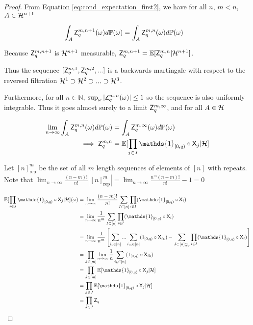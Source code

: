 \begin{proof}
From Equation \ref{eq:cond_expectation_first2}, we have for all $n$, $m<n$, $A\in \mathcal{H}^{n+1}$

\begin{align}
    \int_{A} \mathsf{Z}_q^{m,n+1} (\omega) d\mathbb{P}(\omega) &= \int_{A} \mathsf{Z}_q^{m,n} (\omega) d\mathbb{P}(\omega)
\end{align}

Because $\mathsf{Z}_q^{m,n+1}$ is $\mathcal{H}^{n+1}$ measurable, $\mathsf{Z}_q^{m,n+1} = \mathbb{E}[\mathsf{Z}_q^{m,n}|\mathcal{H}^{n+1}]$.

Thus the sequence $[\mathsf{Z}^{m,1}_q,\mathsf{Z}^{m,2}_q,...]$ is a backwards martingale with respect to the reversed filtration $\mathcal{H}^1\supset\mathcal{H}^2\supset...\supset \mathcal{H}^3$.

Furthermore, for all $n\in \mathbb{N}$, $\sup_\omega|\mathsf{Z}^{m,n}_q(\omega)|\leq 1$ so the sequence is also uniformly integrable. Thus it goes almost surely to a limit $\mathsf{Z}^{m,\infty}_q$, and for all $A\in \mathcal{H}$

\begin{align}
    \lim_{n\to\infty} \int_A \RV{Z}^{m,n}_q(\omega) d\prob{P}(\omega) &= \int_A \RV{Z}^{m,\infty}_q(\omega) d\prob{P}(\omega)\\
    \implies \RV{Z}^{m,n}_q &= \mathbb{E}[\prod_{j\in J} \mathds{1}_{[0,q)}\circ \RV{X}_j|\sigalg{H}]
\end{align}

Let $[n]^m_\mathrm{rep}$ be the set of all $m$ length sequences of elements of $[n]$ with repeats. Note that $\lim_{n\to\infty}\frac{(n-m)!}{n!}|[n]^m_\mathrm{rep}| = \lim_{n\to\infty}\frac{n^m(n-m)!}{n!}-1 = 0$

\begin{align}
    \mathbb{E}[\prod_{j\in J} \mathds{1}_{[0,q)}\circ \RV{X}_j|\sigalg{H}](\omega) &= \lim_{n\to\infty}\frac{(n-m)!}{n!}\sum_{I\subset[n]}\prod_{i\in I} (\mathds{1}_{[0,q)}\circ \RV{X}_i)\\
                                                                      &= \lim_{n\to\infty}\frac{1}{n^m}\sum_{I\subset[n]}\prod_{i\in I}(\mathds{1}_{[0,q)}\circ \RV{X}_i)\\
                                                                      &= \lim_{n\to\infty}\frac{1}{n^m}\left[\sum_{i_1\in [n]}...\sum_{i_m\in [n]} (1_{[0,q)}\circ \RV{X}_{i_k})-\sum_{J\subset[n]^m_\mathrm{rep}}\prod_{i\in I} (\mathds{1}_{[0,q)}\circ \RV{X}_i)\right]\\ 
                                                                      &= \prod_{k\in [m]} \lim_{n\to\infty} \frac{1}{n}\sum_{i_k\in[n]}(1_{[0,q)}\circ\RV{X}_{ik})\\
                                                                      &= \prod_{k\in [m]} \mathbb{E}[\mathds{1}_{[0,q)}\circ \RV{X}_j|\sigalg{H}]\\
                                                                      &= \prod_{k\in J} \mathbb{E}[\mathds{1}_{[0,q)}\circ \RV{X}_j|\sigalg{H}]\\
                                                                      &= \prod_{k\in J} \RV{Z}_q\label{eq:h_measurable}
\end{align}


\end{proof}
